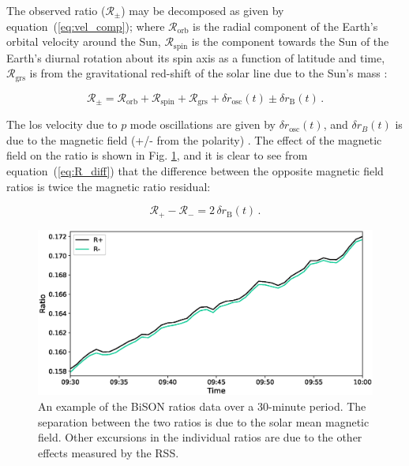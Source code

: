 The observed ratio ($\mathcal{R}_{\pm}$) may be decomposed as given by equation~(\ref{eq:vel_comp}); where $\mathcal{R}_{\mathrm{orb}}$ is the radial component of the Earth's orbital velocity around the Sun, $\mathcal{R}_{\mathrm{spin}}$ is the component towards the Sun of the Earth's diurnal rotation about its spin axis as a function of latitude and time, $\mathcal{R}_{\mathrm{grs}}$ is from the gravitational red-shift of the solar line due to the Sun's mass \citep{elsworth_techniques_1995, dumbill_observation_1999}:

\begin{equation}
\mathcal{R}_{\pm} = \mathcal{R}_{\mathrm{orb}} + \mathcal{R}_{\mathrm{spin}} + \mathcal{R}_{\mathrm{grs}} + \delta {r}_{\mathrm{osc}}(t) \pm \delta {r}_{\mathrm{B}}(t) \, .
\label{eq:vel_comp}
\end{equation}

The \gls{los} velocity due to $p$ mode oscillations are given by $\delta {r}_{\mathrm{osc}}(t)$, and $\delta {r}_B(t)$ is due to the magnetic field (+/- from the polarity) \citep{dumbill_observation_1999}. The effect of the magnetic field on the ratio is shown in Fig. \ref{fig:ratio_split}, and it is clear to see from equation~(\ref{eq:R_diff}) that the difference between the opposite magnetic field ratios is twice the magnetic ratio residual:

\begin{equation}
\mathcal{R}_{+} - \mathcal{R}_{-} = 2 \, \delta {r}_{\mathrm{B}}(t) \, .
\label{eq:R_diff}
\end{equation}

\begin{figure}[ht!]
	\includegraphics[width=\columnwidth]{Fred_ratio_zoom.eps}
	\caption{An example of the BiSON ratios data over a 30-minute period. The separation between the two ratios is due to the solar mean magnetic field. Other excursions in the individual ratios are due to the other effects measured by the RSS.}
	\label{fig:ratio_split}
\end{figure}

